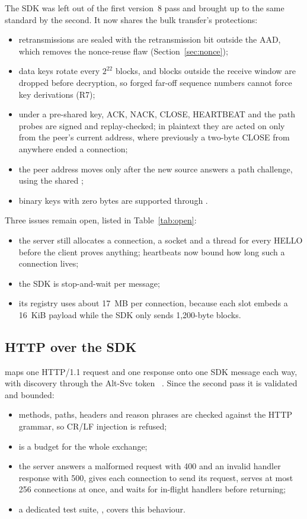 The SDK was left out of the first version~8 pass and brought up to the same standard by the second. It now
shares the bulk transfer's protections:
\begin{itemize}
  \item retransmissions are sealed with the retransmission bit outside the AAD, which removes the nonce-reuse
    flaw (Section~\ref{sec:nonce});
  \item data keys rotate every $2^{22}$ blocks, and blocks outside the receive window are dropped before
    decryption, so forged far-off sequence numbers cannot force key derivations (R7);
  \item under a pre-shared key, ACK, NACK, CLOSE, HEARTBEAT and the path probes are signed and replay-checked;
    in plaintext they are acted on only from the peer's current address, where previously a two-byte CLOSE from
    anywhere ended a connection;
  \item the peer address moves only after the new source answers a path challenge, using the shared
    ;
  \item binary keys with zero bytes are supported through .
\end{itemize}

\noindent Three issues remain open, listed in Table~\ref{tab:open}:
\begin{itemize}
  \item the server still allocates a connection, a socket and a thread for every HELLO before the client
    proves anything; heartbeats now bound how long such a connection lives;
  \item the SDK is stop-and-wait per message;
  \item its registry uses about 17~MB per connection, because each slot embeds a 16~KiB payload while the SDK
    only sends 1,200-byte blocks.
\end{itemize}

\subsection{HTTP over the SDK}

 maps one HTTP/1.1 request and one response onto one SDK message each way, with discovery
through the Alt-Svc token ~\cite{rfc7838}. Since the second pass it is validated and bounded:
\begin{itemize}
  \item methods, paths, headers and reason phrases are checked against the HTTP grammar, so CR/LF injection is
    refused;
  \item {} is a budget for the whole exchange;
  \item the server answers a malformed request with 400 and an invalid handler response with 500, gives each
    connection  to send its request, serves at most 256 connections at once, and waits for
    in-flight handlers before returning;
  \item a dedicated test suite, , covers this behaviour.
\end{itemize}

